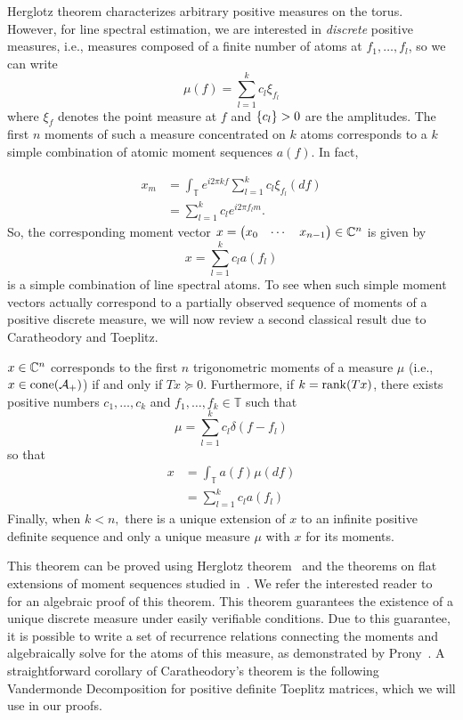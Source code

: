 Herglotz theorem characterizes arbitrary positive measures on the torus.
However, for line spectral estimation, we are interested in \emph{discrete}
positive measures, i.e., measures composed of a finite number of atoms at $f_1,
\ldots, f_l$, so we can write
\[
\mu(f) = \sum_{l=1}^k c_l \xi_{f_l}
\]
where $\xi_f$ denotes the point measure at $f$ and $\left\{ c_l \right\} > 0$ are the
amplitudes. The first $n$ moments of such a measure concentrated on $k$ atoms
corresponds to a $k$ simple combination of atomic moment sequences $a(f).$ In
fact,

\begin{align*}
	x_m &= \int_\mathbb{T} e^{i 2 \pi k f} \sum_{l=1}^k c_l \xi_{f_l}(d f)\\
	&= \sum_{l=1}^k c_l e^{i 2 \pi f_l m}.
\end{align*}
So, the corresponding moment vector
$x = \begin{pmatrix}x_0 & \cdots & x_{n-1}\end{pmatrix} \in \mathbb{C}^n$ is given by
\[
x = \sum_{l=1}^k c_l a(f_l)
\]
is a simple combination of line spectral atoms. To see when such simple moment
vectors actually correspond to a partially observed sequence of moments of a
positive discrete measure, we will now review a second classical result due to
Caratheodory and Toeplitz.

\begin{theorem}
\label{thm:caratheodory-toeplitz}
	$x \in \mathbb{C}^n$ corresponds to the first $n$ trigonometric moments of a measure $\mu$ (i.e., $x \in \operatorname{cone}(\mathcal{A}_+)$) if and only if $T x \succeq 0.$ Furthermore, if $k = \operatorname{rank}(T x)$, there exists positive numbers $c_1, \ldots, c_k$ and $f_1, \ldots, f_k \in \mathbb{T}$ such  that
\[
	\mu = \sum_{l=1}^k c_l \delta(f - f_l)
\]
so that
\begin{align*}
	x &= \int_{\mathbb{T}} a(f) \mu(df)\\
	& = \sum_{l=1}^k c_l a(f_l)
\end{align*}
Finally, when $k < n,$ there is a unique extension of $x$ to an infinite positive definite sequence and only a unique measure $\mu$ with $x$ for its moments.
\end{theorem}

This theorem can be proved using Herglotz theorem~\cite{herglotz} and the
theorems on flat extensions of moment sequences studied in~\cite{Curto97}. We
refer the interested reader to~\cite{grenander01} for an algebraic proof of this
theorem. This theorem guarantees the existence of a unique discrete measure
under easily verifiable conditions. Due to this guarantee, it is possible to
write a set of recurrence relations connecting the moments and algebraically
solve for the atoms of this measure, as demonstrated by Prony~\cite{prony1795}.
A straightforward corollary of Caratheodory's theorem is the following
Vandermonde Decomposition for positive definite Toeplitz matrices, which we will use in our proofs.

